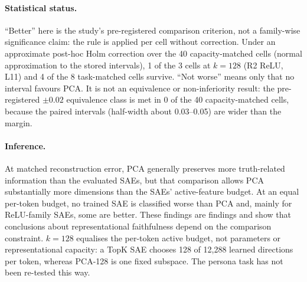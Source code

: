 \paragraph{Statistical status.} ``Better'' here is the study's pre-registered comparison criterion, not a
family-wise significance claim: the rule is applied per cell without correction. Under an approximate post-hoc Holm
correction over the 40 capacity-matched cells (normal approximation to the stored intervals), 1 of the 3 cells at
$k=128$ (R2 ReLU, L11) and 4 of the 8 task-matched cells survive. ``Not worse'' means only that no interval favours PCA. It is not an equivalence or non-inferiority result: the pre-registered $\pm0.02$ equivalence class is met in 0 of the 40 capacity-matched cells, because the paired intervals (half-width about 0.03--0.05) are wider than the margin.

\paragraph{Inference.} At matched reconstruction error, PCA generally preserves more truth-related information than
the evaluated SAEs, but that comparison allows PCA substantially more dimensions than the SAEs' active-feature budget.
At an equal per-token budget, no trained SAE is classified worse than PCA and, mainly for ReLU-family SAEs, some are better. These
findings are  findings and show that conclusions about representational faithfulness depend on the
comparison constraint. $k=128$ equalises the per-token active budget, not parameters or representational capacity: a
TopK SAE chooses 128 of 12,288 learned directions per token, whereas PCA-128 is one fixed subspace. The persona task
has not been re-tested this way.


